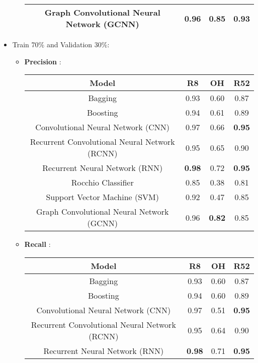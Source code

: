 \begin{itemize}
\begin{itemize}
\begin{tabular}{|c|c|c|c|}
                Graph Convolutional Neural Network (GCNN) & 0.96 & \textbf{0.85} & 0.93\\\hline
            \end{tabular}
    \end{itemize}    
    \item Train 70\% and Validation 30\%:
    \begin{itemize}
        \item \textbf{Precision} : 
            \newline
            \begin{tabular}{|c|c|c|c|}\hline
                 \textbf{Model} & \textbf{R8} & \textbf{OH} & \textbf{R52} \\\hline
                Bagging & 0.93 & 0.60 &  0.87\\\hline
                Boosting & 0.94 & 0.61 & 0.89 \\\hline
                Convolutional Neural Network (CNN) & 0.97 & 0.66 &  \textbf{0.95}\\\hline
                Recurrent Convolutional Neural Network (RCNN) & 0.95 & 0.65 &  0.90\\\hline
                Recurrent Neural Network (RNN) & \textbf{0.98} & 0.72 & \textbf{0.95} \\\hline
                Rocchio Classifier & 0.85 & 0.38 & 0.81 \\\hline
                Support Vector Machine (SVM) & 0.92 & 0.47 & 0.85 \\\hline
                Graph Convolutional Neural Network (GCNN) & 0.96 & \textbf{0.82} & 0.85\\\hline
            \end{tabular}
        \item \textbf{Recall} :
            \newline
            \begin{tabular}{|c|c|c|c|}\hline
                 \textbf{Model} & \textbf{R8} & \textbf{OH} & \textbf{R52} \\\hline
                Bagging & 0.93 & 0.60 & 0.87 \\\hline
                Boosting & 0.94 & 0.60 &  0.89\\\hline
                Convolutional Neural Network (CNN) & 0.97 & 0.51 & \textbf{0.95} \\\hline
                Recurrent Convolutional Neural Network (RCNN) & 0.95 & 0.64 &  0.90\\\hline
                Recurrent Neural Network (RNN) & \textbf{0.98} & 0.71 & \textbf{0.95}  \\\hline

\end{tabular}
\end{itemize}
\end{itemize}
